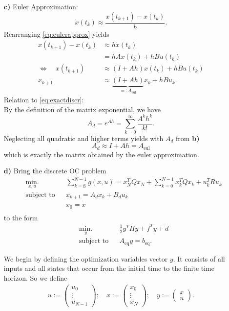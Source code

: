 \documentclass[]{article}
\newcommand{\ind}[2]{{#1}_{\mathrm{#2}}}
\newcommand{\trp}{^T}
\newcommand{\dotx}{\dot x}
\newcommand{\xnull}{x_0}
\newcommand{\unull}{u_0}
\newcommand{\xN}{x_N}
\newcommand{\xk}{x_k}
\newcommand{\uk}{u_k}
\newcommand{\Ad}{A_d}
\newcommand{\Bd}{B_d}
\newcommand{\xkplus}{x_{k+1}}
\newcommand{\tk}{t_{k}}
\newcommand{\tkplus}{t_{k+1}}
\newcommand{\Aeul}{\ind{A}{eul}}
\newcommand{\Aeq}{\ind{A}{eq}}
\newcommand{\beq}{\ind{b}{eq}}
\newcommand{\xbar}{\bar{x}}
\newcommand{\vectorthree}[3]{\begin{pmatrix}
		#1 \\ #2 \\ #3
\end{pmatrix}}
\newcommand{\vectortwo}[2]{\begin{pmatrix}
		#1 \\ #2
\end{pmatrix}}
\newcommand{\half}{\frac{1}{2}}
\begin{document}
\begin{enumerate}
		\item[\bf c)] Euler Approximation: \begin{equation}
			\dotx(\tk) \approx \frac{x(\tkplus) - x(\tk)}{h}. \label{eq:eulerapprox} 
		\end{equation}
		Rearranging \eqref{eq:eulerapprox} yields 
		\begin{align}
			x(\tkplus) - x(\tk) &\approx h \dotx(\tk)\\
			&= hAx(\tk) + hBu(\tk)\\
			\Longleftrightarrow \quad x(\tkplus) &\approx (I+Ah)x(\tk) + hBu(\tk)\\
			 \xkplus &\approx \underbrace{(I+Ah)}_{=: \Aeul} \xk + hB\uk.
		\end{align}
		Relation to \eqref{eq:exactdiscr}:\\
		By the definition of the matrix exponential, we have
		\begin{equation}
			\Ad = e^{Ah} = \sum_{k=0}^{\infty} \frac{A^kh^k}{k!}.
		\end{equation}
		 Neglecting all quadratic and higher terms yields with $ \Ad $ from {\bf b)} \[ \Ad \approx I+Ah = \Aeul  \] which is exactly the matrix obtained by the euler approximation.
	\item[\bf d)]  Bring the discrete OC problem
	\begin{equation}
		\begin{aligned}
		& \underset{x,u}{\text{min.}}
		& & \sum_{k=ß}^{N-1} g(x,u) =  \xN\trp Q \xN + \sum_{k = 0}^{N-1} \xk \trp Q \xk + \uk\trp R \uk\\
		& \text{subject to}
		& & \xkplus = \Ad \xk + \Bd \uk\\
		& & &\xnull = \xbar\\ 
		\end{aligned}
	\end{equation}
	to the form
	\begin{equation} \label{eq:quadproblem}
		\begin{aligned}
		& \underset{y}{\text{min.}}
		& & \half y\trp H y + f\trp y + d\\
		& \text{subject to}
		& & \Aeq y = \beq.
		\end{aligned}
	\end{equation}
	
	
	We begin by defining the optimization variables vector $ y $. It consists of all inputs and all states that occur from the initial time to the finite time horizon. So we define
	\begin{equation}
		\begin{gathered}
		u := \vectorthree{\unull}{\vdots}{u_{N-1}}; \quad  x := \vectorthree{\xnull}{\vdots}{\xN}; \quad y := \vectortwo{x}{u} .
		\end{gathered}
	\end{equation}
	 

\end{enumerate}
\end{document}
